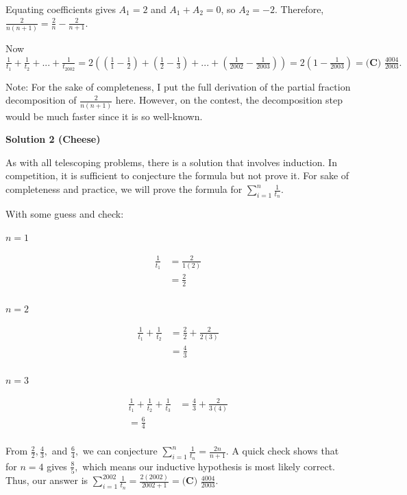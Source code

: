\begin{enumerate}
 Equating coefficients gives $A_1 = 2$ and $A_1 + A_2 = 0$, so $A_2 = -2$. Therefore, $\frac{2}{n(n+1)} = \frac{2}{n} - \frac{2}{n+1}$.

 Now $\frac{1}{t_1} + \frac{1}{t_2} + ... + \frac{1}{t_{2002}} = 2((\frac{1}{1} - \frac{1}{2}) + (\frac{1}{2} - \frac{1}{3}) + ... + (\frac{1}{2002} - \frac{1}{2003})) = 2(1 - \frac{1}{2003}) = \boxed{\textbf{(C) } \frac{4004}{2003}}.$

 Note: For the sake of completeness, I put the full derivation of the partial fraction decomposition of $\frac{2}{n(n+1)}$ here. However, on the contest, the decomposition step would be much faster since it is so well-known.

 



\textbf{Solution 2 (Cheese)}

As with all telescoping problems, there is a solution that involves induction. In competition, it is sufficient to conjecture the formula but not prove it. For sake of completeness and practice, we will prove the formula for $\sum_{i=1}^{n} \frac{1}{t_n}.$

 With some guess and check:

 $n=1$

 \begin{align*}\frac{1}{t_1}&=\frac{2}{1(2)} \\&=\frac{2}{2} \\\end{align*}


 $n=2$

 \begin{align*}\frac{1}{t_1}+\frac{1}{t_2}&=\frac{2}{2}+\frac{2}{2(3)} \\&=\frac{4}{3} \\\end{align*}


 $n=3$

 \begin{align*}\frac{1}{t_1}+\frac{1}{t_2}+\frac{1}{t_3}&=\frac{4}{3}+\frac{2}{3(4)} \\=\frac{6}{4} \\\end{align*}


 From $\frac{2}{2}, \frac{4}{3},$ and $\frac{6}{4},$ we can conjecture $\sum_{i=1}^{n} \frac{1}{t_n} = \frac{2n}{n+1}.$ A quick check shows that for $n=4$ gives $\frac{8}{5},$ which means our inductive hypothesis is most likely correct. Thus, our answer is $\sum_{i=1}^{2002} \frac{1}{t_n} = \frac{2(2002)}{2002+1}=\boxed{\textbf{(C) } \frac{4004}{2003}}.$ 


\end{enumerate}
